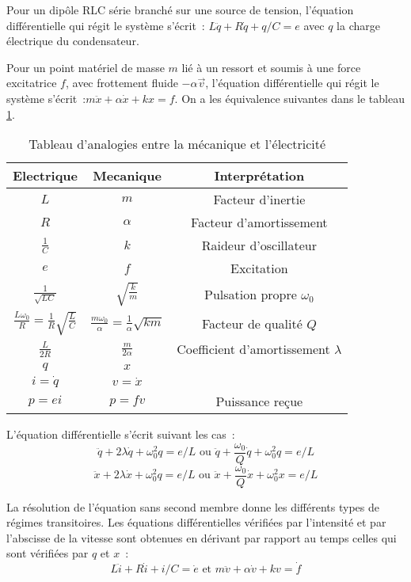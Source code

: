 Pour un dipôle RLC série branché sur une source de tension, l'équation
différentielle qui régit le système s'écrit~: \(L \ddot{q} + R\dot{q} + q/C =
e\) avec \(q\) la charge électrique du condensateur.

Pour un point matériel de masse \(m\) lié à un ressort et soumis à une force
excitatrice \(f\), avec frottement fluide \(-\alpha \vec{v}\), l'équation
différentielle qui régit le système s'écrit~:\(m\ddot{x}+\alpha \dot{x}+k x =
f\). On a les équivalence suivantes dans le tableau \ref{tab:equiv}.

\begin{table}[h]
  \centering
  \begin{tabular}{||c|c|c||}
    \hline
    Electrique & Mecanique & Interprétation\\
    \hline
    \(L\) & \(m\) & Facteur d'inertie\\
    \(R\) & \(\alpha\) & Facteur d'amortissement\\
    \(\frac{1}{C}\) & \(k\) & Raideur d'oscillateur\\
    \(e\) & \(f\) & Excitation\\
    \(\frac{1}{\sqrt{LC}}\) & \(\sqrt{\frac{k}{m}}\) & Pulsation propre
    \(\omega_0\)\\
    \(\frac{L\omega_0}{R} = \frac{1}{R}\sqrt{\frac{L}{C}}\) &
    \(\frac{m\omega_0}{\alpha} = \frac{1}{\alpha}\sqrt{km}\) & Facteur de
    qualité \(Q\)\\
    \(\frac{L}{2R}\) & \(\frac{m}{2\alpha}\) & Coefficient d'amortissement
    \(\lambda\)\\
    \(q\) & \(x\) & \\
    \(i=\dot{q}\) & \(v=\dot{x}\) & \\
    \(p=ei\) & \(p=fv\) & Puissance reçue\\
    \hline
  \end{tabular}
  \caption{Tableau d'analogies entre la mécanique et l'électricité}
  \label{tab:equiv}
\end{table}

L'équation différentielle s'écrit suivant les cas~:
\[\ddot{q}+2\lambda\dot{q}+\omega_0^2 q = e/L \text{~ou~}
\ddot{q}+\frac{\omega_0}{Q}\dot{q}+\omega_0^2 q = e/L\]
\[\ddot{x}+2\lambda\dot{x}+\omega_0^2 q = e/L \text{~ou~}
\ddot{x}+\frac{\omega_0}{Q}\dot{x}+\omega_0^2 x = e/L\]

La résolution de l'équation sans second membre donne les différents types de
régimes transitoires. Les équations différentielles vérifiées par l'intensité et
par l'abscisse de la vitesse sont obtenues en dérivant par rapport au temps
celles qui sont vérifiées par \(q\) et \(x\)~:
\[L\ddot{i}+R\dot{i}+i/C = \dot{e} \text{~et~} m\ddot{v}+\alpha\dot{v}+kv =
\dot{f}\]

